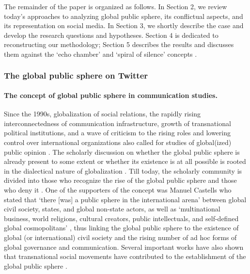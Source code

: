 The remainder of the paper is organized as follows. In Section 2, we review today’s approaches to analyzing global public sphere, its conflictual aspects, and its representation on social media. In Section 3, we shortly describe the case and develop the research questions and hypotheses. Section 4 is dedicated to reconstructing our methodology; Section 5 describes the results and discusses them against the ‘echo chamber’ and ‘spiral of silence’ concepts \cite{NoelleNeumann,Sunstein2002}.

\subsubsection{The global public sphere on Twitter}

\paragraph{The concept of global public sphere in communication studies.} Since the 1990s, globalization of social relations, the rapidly rising interconnectedness of communication infrastructure, growth of transnational political institutions, and a wave of criticism to the rising roles and lowering control over international organizations also called for studies of global(ized) public opinion \cite{Sparks2001,Sparks2005}. The scholarly discussion on whether the global public sphere is already present to some extent or whether its existence is at all possible is rooted in the dialectical nature of globalization \cite{Beck2015,Sparks2003}. Till today, the scholarly community is divided into those who recognize the rise of the global public sphere and those who deny it \cite{Fraser2014}. One of the supporters of the concept was Manuel Castells who stated that ‘there [was] a public sphere in the international arena’ between global civil society, states, and global non-state actors, as well as ‘multinational business, world religions, cultural creators, public intellectuals, and self-defined global cosmopolitans’ \cite[p.~80]{Castells2008}, thus linking the global public sphere to the existence of global (or international) civil society and the rising number of ad hoc forms of global governance and communication. Several important works have also shown that transnational social movements have contributed to the establishment of the global public sphere \cite{GuidryKennedyZald,Smith2007,Castells2008,CottleLester}.

